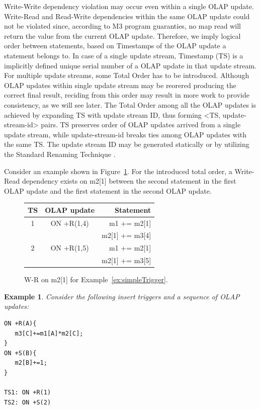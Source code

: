 \documentclass{sig-semester}
\newtheorem{example}[theorem]{Example}
\def\OLAP{OLAP\xspace}
\def\M3{M3\xspace}
\begin{document}
Write-Write dependency violation may occur even within a single \OLAP update. Write-Read and Read-Write dependencies within the same \OLAP update could not be violated since, according to \M3 program guaranties, no map read will return the value from the current \OLAP update. Therefore, we imply logical order between statements, based on Timestamps of the \OLAP update a statement belongs to. In case of a single update stream, Timestamp (TS) is a implicitly defined unique serial number of a \OLAP update in that update stream. For multiple update streams, some Total Order has to be introduced. Although \OLAP updates within single update stream may be reorered producing the correct final result, reciding from this order may result in more work to provide consistency, as we will see later. The Total Order among all the \OLAP updates is achieved by expanding TS with update stream ID, thus forming <TS, update-stream-id> pairs. TS preserves order of \OLAP updates arrived from a single update stream, while update-stream-id breaks ties among \OLAP updates with the same TS. The update stream ID may be generated statically or by utilizing the Standard Renaming Technique \cite{Welch04}.

Consider an example shown in Figure~\ref{fig:streamWR}. For the introduced total order, a Write-Read dependency exists on m2[1] between the second statement in the first \OLAP update and the first statement in the second \OLAP update.

\begin{figure}
\begin{center}

\begin{tabular}{c|c|r}
TS & \OLAP update & Statement\\
\hline
1 & ON +R(1,4) & m1 += m2[1]    \\
  &            & m2[1] += m3[4] \\
\hline
2 & ON +R(1,5) & m1 += m2[1]    \\
  &            & m2[1] += m3[5] \\
\end{tabular}
\end{center}

\vspace{-3mm}
\caption{W-R on m2[1] for Example~\ref{ex:simpleTrigger}.}
\label{fig:streamWR}
\vspace{-2mm}
\end{figure}



\begin{example} \em
\label{ex:foreachTrigger}
Consider the following insert triggers and a sequence of \OLAP updates:
\begin{verbatim}
ON +R(A){
   m3[C]+=m1[A]*m2[C];
}
ON +S(B){
   m2[B]+=1;
}

TS1: ON +R(1)
TS2: ON +S(2)
\end{verbatim}
\end{example}
\end{document}
